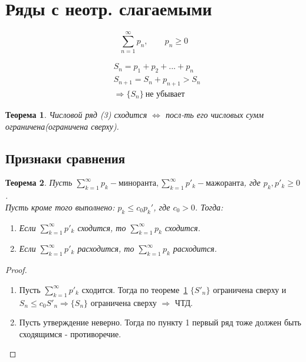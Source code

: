 \documentclass[12pt, oneside]{article}
\theoremstyle{plain}
\newtheorem{Theorem}{Теорема}
\newcommand{\lsum}{\sum\limits}
\begin{document}
	\section{Ряды с неотр. слагаемыми}
	
	\begin{minipage}{0.35\textwidth}
	\begin{equation} \tag{3}
		\sum_{n=1}^{\infty} p_n, \qquad p_n \geq 0
	\end{equation}
	\end{minipage}
	\hfill
	\begin{minipage}{0.55\textwidth}
	\begin{equation} \nonumber
	\begin{split}
		& S_n = p_1 + p_2 + ... + p_n \\
		& S_{n+1} = S_n + p_{n+1} > S_n \\
		& \Rightarrow \{S_n\} \ \text{не убывает}
	\end{split}
	\end{equation}
	\end{minipage}

	\begin{Theorem}
		\label{th:lim_of_S_n}
		Числовой ряд (3) сходится \(\Leftrightarrow\) посл-ть его числовых сумм 
		ограничена(ограничена сверху).
	\end{Theorem}

	\subsection{Признаки сравнения}
	\begin{Theorem}
		Пусть \(\lsum_{k=1}^{\infty} p_k - \text{миноранта}, 
		\lsum_{k=1}^{\infty} p'_k - \text{мажоранта}\), где \(p_k, p'_k \geq 0\).\\
		Пусть кроме того выполнено: \(p_k \leq c_0 p_k'\), где \(c_0 > 0\). Тогда:
		\begin{enumerate}
			\item Если \(\lsum_{k=1}^{\infty} p'_k\) сходится, то \(\lsum_{k=1}^{\infty} p_k\) сходится.
			\item Если \(\lsum_{k=1}^{\infty} p'_k\) расходится, то \(\lsum_{k=1}^{\infty} p_k\) расходится.
		\end{enumerate}
	\end{Theorem}
	\begin{proof} \
		\begin{enumerate}
			\item Пусть \(\lsum_{k=1}^{\infty} p'_k\) сходится. Тогда по 
				теореме~\ref{th:lim_of_S_n} \(\{S'_n\}\) ограничена сверху 
				и \(S_n \leq c_0 S'_n \Rightarrow \{S_n\}\) ограничена сверху 
				\(\Rightarrow\) ЧТД.
			\item Пусть утверждение неверно. Тогда по пункту 1 первый ряд тоже
				должен быть сходящимся - противоречие.
		\end{enumerate}
	\end{proof}
\end{document}
